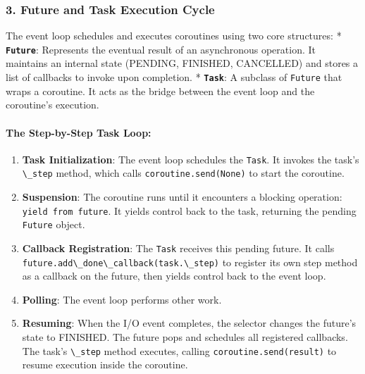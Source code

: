 \hypertarget{future-and-task-execution-cycle}{%
\subsubsection{3. Future and Task Execution
Cycle}\label{future-and-task-execution-cycle}}

The event loop schedules and executes coroutines using two core
structures: * \textbf{\passthrough{\lstinline!Future!}}: Represents the
eventual result of an asynchronous operation. It maintains an internal
state (PENDING, FINISHED, CANCELLED) and stores a list of callbacks to
invoke upon completion. * \textbf{\passthrough{\lstinline!Task!}}: A
subclass of \passthrough{\lstinline!Future!} that wraps a coroutine. It
acts as the bridge between the event loop and the coroutine's execution.

\hypertarget{the-step-by-step-task-loop}{%
\paragraph{The Step-by-Step Task
Loop:}\label{the-step-by-step-task-loop}}

\begin{enumerate}
\def\labelenumi{\arabic{enumi}.}
\tightlist
\item
  \textbf{Task Initialization}: The event loop schedules the
  \passthrough{\lstinline!Task!}. It invokes the task's
  \passthrough{\lstinline!\_step!} method, which calls
  \passthrough{\lstinline!coroutine.send(None)!} to start the coroutine.
\item
  \textbf{Suspension}: The coroutine runs until it encounters a blocking
  operation: \passthrough{\lstinline!yield from future!}. It yields
  control back to the task, returning the pending
  \passthrough{\lstinline!Future!} object.
\item
  \textbf{Callback Registration}: The \passthrough{\lstinline!Task!}
  receives this pending future. It calls
  \passthrough{\lstinline!future.add\_done\_callback(task.\_step)!} to
  register its own step method as a callback on the future, then yields
  control back to the event loop.
\item
  \textbf{Polling}: The event loop performs other work.
\item
  \textbf{Resuming}: When the I/O event completes, the selector changes
  the future's state to FINISHED. The future pops and schedules all
  registered callbacks. The task's \passthrough{\lstinline!\_step!}
  method executes, calling
  \passthrough{\lstinline!coroutine.send(result)!} to resume execution
  inside the coroutine.
\end{enumerate}

